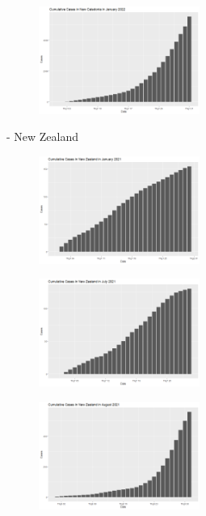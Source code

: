 \documentclass[a4paper]{article}
\theoremstyle{definition}
\begin{document}
\begin{enumerate}[i)]
\begin{enumerate}[1)]
		\begin{figure} [!htp]
  		\centering
  		\includegraphics [width=0.47\textwidth] {Images/cal_cases_1}
		\end{figure}
	- New Zealand\\
		\begin{figure} [!htp]
  		\centering
  		\includegraphics [width=0.47\textwidth] {Images/zea_cases_1}
		\end{figure}
		
		\begin{figure} [!htp]
  		\centering
  		\includegraphics [width=0.47\textwidth] {Images/zea_cases_4}
		\end{figure}
		
		\begin{figure} [!htp]
  		\centering
  		\includegraphics [width=0.47\textwidth] {Images/zea_cases_6}
		\end{figure}
		

\end{enumerate}
\end{enumerate}
\end{document}
